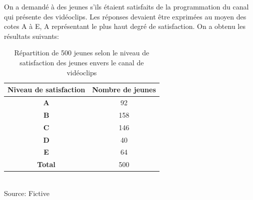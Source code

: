 \documentclass[answers, addpoints, 12pt,fleqn]{exam}
\theoremstyle{definition}       %
\begin{document}
\begin{questions}


\vspace{0.3cm}

\question On a demandé à des jeunes s'ils étaient satisfaits de la programmation du canal qui présente des vidéoclips. Les réponses devaient être exprimées au moyen des cotes A à E, A représentant le plus haut degré de satisfaction. On a obtenu les résultats suivants:
\vspace{0.4cm}
\begin{table}[h]
\label{tableauQuestion2}
\caption{Répartition de 500 jeunes selon le niveau de satisfaction des jeunes envers le canal de vidéoclips}
 \begin{center}
\vspace{-0.3cm}
\begin {tabular}{|c|c|}
\hline
\textbf{Niveau de satisfaction}   &\textbf{Nombre de jeunes}               \\ \hline
\textbf{A} &92\\ \hline
\textbf{B} &158\\ \hline
\textbf{C} &146\\ \hline
\textbf{D} &40\\ \hline
\textbf{E} &64 \\ \hline
\textbf{Total} &500\\ \hline
\end {tabular}\\ 
\footnotesize{Source: Fictive}
\end{center}
\end {table}
\bigskip
{}
\end{questions}
\end{document}
